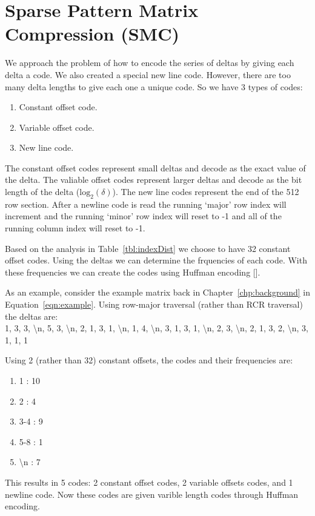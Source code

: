 \section{Sparse Pattern Matrix Compression (SMC)}
\label{sec:smc}
We approach the problem of how to encode the series of deltas by giving each delta a code. We also created a special new line code. However, there are too many delta lengths to give each one a unique code. So we have 3 types of codes:
\begin{enumerate}
    \item Constant offset code.
    \item Variable offset code.
    \item New line code.
\end{enumerate}

The constant offset codes represent small deltas and decode as the exact value of the delta. The valiable offset codes represent larger deltas and decode as the bit length of the delta ($\textrm{log}_2(\delta)$). The new line codes represent the end of the 512 row section. After a newline code is read the running `major' row index will increment and the running `minor' row index will reset to -1 and all of the running column index will reset to -1.

Based on the analysis in Table~\ref{tbl:indexDist} we choose to have 32 constant offset codes. Using the deltas we can determine the frquencies of each code. With these frequencies we can create the codes using Huffman encoding [\cite{prelim:huffman}].

As an example, consider the example matrix back in Chapter~\ref{chp:background} in Equation~\ref{eqn:example}. Using row-major traversal (rather than RCR traversal) the deltas are:\\
1, 3, 3, \textbackslash n, 5, 3, \textbackslash n, 2, 1, 3, 1, \textbackslash n, 1, 4, \textbackslash n, 3, 1, 3, 1, \textbackslash n, 2, 3, \textbackslash n, 2, 1, 3, 2, \textbackslash n, 3, 1, 1, 1

Using 2 (rather than 32) constant offsets, the codes and their frequencies are:\\
\begin{enumerate}
    \item 1 : 10
    \item 2 : 4
    \item 3-4 : 9
    \item 5-8 : 1
    \item \textbackslash n : 7
\end{enumerate}
This results in 5 codes: 2 constant offset codes, 2 variable offsets codes, and 1 newline code. Now these codes are given varible length codes through Huffman encoding.

